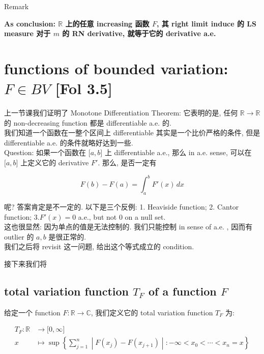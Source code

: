 \begin{qlremark}{Remark}

\textbf{As conclusion: \(\mathbb{R}\) 上的任意 increasing 函数 \(F\), 其 right limit induce 的 LS measure 对于 \(m\) 的 RN derivative, 就等于它的 derivative a.e.}

\end{qlremark}

\section{\texorpdfstring{functions of bounded variation: \(F \in BV\) {[}Fol 3.5{]}}{functions of bounded variation: F \textbackslash in BV {[}Fol 3.5{]}}}

上一节课我们证明了 Monotone Differentiation Theorem: 它表明的是, 任何 \(\mathbb{R}\rightarrow\mathbb{R}\) 的 non-decreasing function 都是 differentiable a.e. 的.\\
我们知道一个函数在一整个区间上 differentiable 其实是一个比价严格的条件, 但是 differentiable a.e. 的条件就略好达到一些.\\
Question: 如果一个函数在 \(\lbrack a,b\rbrack\) 上 differentiable a.e., 那么 in a.e. sense, 可以在 \(\lbrack a,b\rbrack\) 上定义它的 derivative \(F'\). 那么, 是否一定有

\[F(b) - F(a) = \int_{a}^{b}F'(x)\, dx\]

呢? 答案肯定是不一定的. 以下是三个反例: 1. Heaviside function; 2. Cantor function; 3.\(F'(x) = 0\) a.e., but not \(0\) on a null set.\\
这也很显然: 因为单点的值是无法控制的. 我们只能控制 in sense of a.e. , 因而有 outlier 的 \(a,b\) 是很正常的.\\
我们之后将 revisit 这一问题, 给出这个等式成立的 condition.

接下来我们将

\subsection{\texorpdfstring{total variation function \(T_{F}\) of a function \(F\)}{total variation function T\_\{F\} of a function F}}\label{total-variation-function-t_f-of-a-function-f}

\begin{definition}{}

给定一个 function \(F:\mathbb{R}\rightarrow\mathbb{C}\), 我们定义它的 total variation function \(T_{F}\) 为:

\[\begin{matrix}
{T_{F}:\mathbb{R}} & {\rightarrow\lbrack 0,\infty\rbrack} \\
x & {\mapsto\sup\left\{ \sum\limits_{j = 1}^{n} \middle| F(x_{j}) - F(x_{j + 1}) \middle| : - \infty < x_{0} < \cdots < x_{n} = x \right\}}
\end{matrix}\]

\end{definition}

